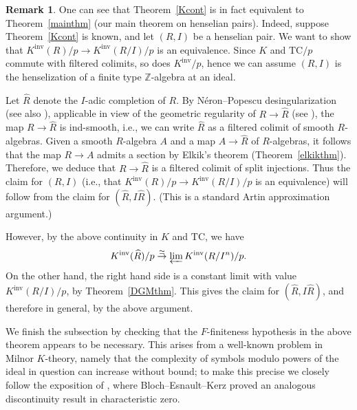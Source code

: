 \documentclass{amsart}
\newcommand{\knf}{K^{\mathrm{inv}}}
\theoremstyle{definition}
\newtheorem{remark}[definition]{Remark}
\renewcommand{\hat}{\widehat}
\newcommand{\TC}{\mathrm{TC}}
\begin{document}
\begin{remark}
\label{henspairequivtocontinuity}
One can see that Theorem~\ref{Kcont} is in fact equivalent to Theorem~\ref{mainthm} (our main theorem on henselian pairs).  Indeed, suppose Theorem~\ref{Kcont} is known, and let $(R,I)$ be a henselian pair.  We want to show that $\knf(R)/p\rightarrow \knf(R/I)/p$ is an equivalence.  Since $K$ and $\TC/p$ commute with filtered colimits, so does $\knf/p$, hence we can assume $(R,I)$ is the henselization of a finite type $\mathbb{Z}$-algebra at an ideal.  

Let $\hat{R}$ denote the $I$-adic completion of $R$. 
By N\'eron--Popescu desingularization \cite{Popescu1, Popescu2} (see also
\cite[Tag 07BW]{stacks-project}), applicable in view of the geometric regularity of $R \to
\hat{R}$ (see \cite[7.8.3(v)]{EGA_IV_2}), the map $R\rightarrow \hat{R}$ is
ind-smooth, i.e., we can write $\hat{R}$ as a filtered colimit of smooth
$R$-algebras.
Given a smooth $R$-algebra $A$ and a map $A \to \hat{R}$ of
$R$-algebras, it follows
that the map $R \to A$ admits a section by Elkik's theorem
(Theorem~\ref{elkikthm}). 
Therefore,  we deduce that $R\rightarrow \hat{R}$ is a filtered colimit
of split injections.  Thus the claim for $(R,I)$ (i.e., that $\knf(R)/p \to
\knf(R/I)/p$ is an equivalence) will follow from the claim for
$(\hat{R}, I \hat{R})$.  (This is a standard Artin approximation argument.)

However, by the above continuity in $K$ and $\TC$, we have
$$\knf(\hat{R})/p\overset{\simeq}{\rightarrow}\varprojlim
\knf(R/I^n)/p.$$  On the other hand, the right hand side is a constant limit
with value $\knf(R/I)/p$, by Theorem~\ref{DGMthm}.  This gives the claim for
$(\hat{R}, I\hat{R})$, and therefore in general, by the above argument.
\end{remark}

We finish the subsection by checking that the $F$-finiteness hypothesis in the
above theorem appears to be necessary. This arises from a well-known problem in
Milnor $K$-theory, namely that the complexity of symbols modulo powers of the
ideal in question can increase without bound; to make this precise we closely
follow the exposition of \cite[App.~B]{BlochEsnaultKerz2013}, where Bloch--Esnault--Kerz proved an analogous discontinuity result in characteristic zero.
\end{document}
